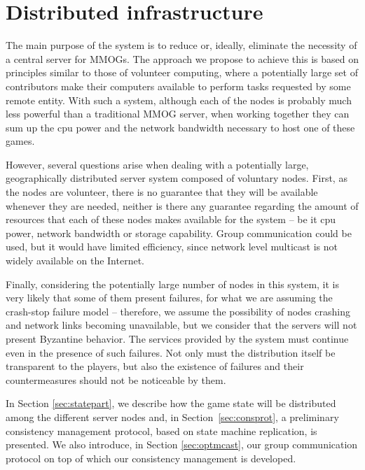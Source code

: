 \documentclass[]{usiinfprospectus}
\begin{document}
\section{Distributed infrastructure} \label{sec:distserver}

The main purpose of the system is to reduce or, ideally, eliminate the necessity of a central server for MMOGs. The approach we propose to achieve this is based on principles similar to those of volunteer computing, where a potentially large set of contributors make their computers available to perform tasks requested by some remote entity. With such a system, although each of the nodes is probably much less powerful than a traditional MMOG server, when working together they can sum up the cpu power and the network bandwidth necessary to host one of these games.

However, several questions arise when dealing with a potentially large, geographically distributed server system composed of voluntary nodes. First, as the nodes are volunteer, there is no guarantee that they will be available whenever they are needed, neither is there any guarantee regarding the amount of resources that each of these nodes makes available for the system -- be it cpu power, network bandwidth or storage capability. Group communication could be used, but it would have limited efficiency, since network level multicast is not widely available on the Internet.

Finally, considering the potentially large number of nodes in this system, it is very likely that some of them present failures, for what we are assuming the crash-stop failure model -- therefore, we assume the possibility of nodes crashing and network links becoming unavailable, but we consider that the servers will not present Byzantine behavior. The services provided by the system must continue even in the presence of such failures. Not only must the distribution itself be transparent to the players, but also the existence of failures and their countermeasures should not be noticeable by them.

In Section \ref{sec:statepart}, we describe how the game state will be distributed among the different server nodes and, in \mbox{Section \ref{sec:consprot}}, a preliminary consistency management protocol, based on state machine replication, is presented. We also introduce, in Section \ref{sec:optmcast}, our group communication protocol on top of which our consistency management is developed.

\end{document}
